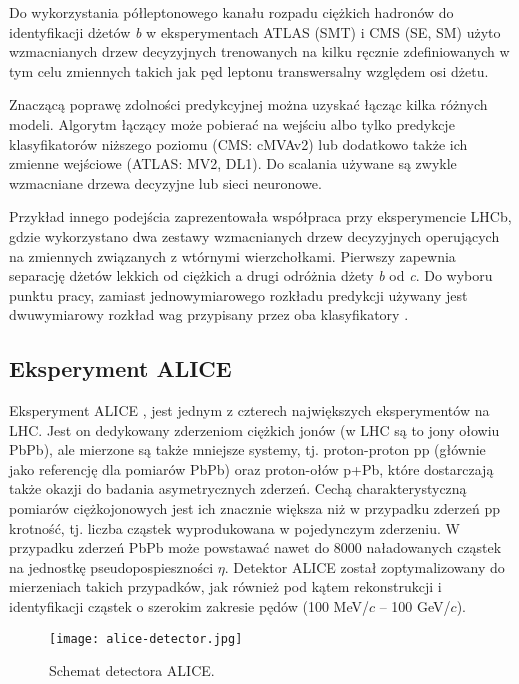 Do wykorzystania półleptonowego kanału rozpadu ciężkich hadronów do identyfikacji dżetów \textit{b} w eksperymentach ATLAS (SMT) i CMS (SE, SM) użyto wzmacnianych drzew decyzyjnych trenowanych na kilku ręcznie zdefiniowanych w tym celu zmiennych takich jak pęd leptonu transwersalny względem osi dżetu.

Znaczącą poprawę zdolności predykcyjnej można uzyskać łącząc kilka różnych modeli. 
Algorytm łączący może pobierać na wejściu albo tylko predykcje klasyfikatorów niższego poziomu (CMS: cMVAv2) lub dodatkowo także ich zmienne wejściowe (ATLAS: MV2, DL1). Do scalania używane są zwykle wzmacniane drzewa decyzyjne lub sieci neuronowe.

Przykład innego podejścia zaprezentowała współpraca przy eksperymencie LHCb, gdzie wykorzystano dwa zestawy wzmacnianych drzew decyzyjnych operujących na zmiennych związanych z wtórnymi wierzchołkami. Pierwszy zapewnia separację dżetów lekkich od ciężkich a drugi odróżnia dżety \textit{b} od \textit{c}. 
Do wyboru punktu pracy, zamiast jednowymiarowego rozkładu predykcji używany jest dwuwymiarowy rozkład wag przypisany przez oba klasyfikatory \cite{Aaij:2015yqa}.


\subsection{Eksperyment ALICE}

Eksperyment ALICE \cite{Aamodt:2008zz}, \cite{Abelev:2014ffa} jest jednym z czterech największych eksperymentów na LHC. Jest on dedykowany zderzeniom ciężkich jonów (w LHC są to jony ołowiu PbPb), ale mierzone są także mniejsze systemy, tj. proton-proton pp (głównie jako referencję dla pomiarów PbPb) oraz proton-ołów p+Pb, które dostarczają także okazji do badania asymetrycznych zderzeń. Cechą charakterystyczną pomiarów ciężkojonowych jest ich znacznie większa niż w przypadku zderzeń pp krotność, tj. liczba cząstek wyprodukowana w pojedynczym zderzeniu. W przypadku zderzeń PbPb może powstawać nawet do 8000 naładowanych cząstek na jednostkę pseudopospieszności $\eta$. Detektor ALICE został zoptymalizowany do mierzeniach takich przypadków, jak również pod kątem rekonstrukcji i identyfikacji cząstek o szerokim zakresie pędów (100 MeV/$c$ -- 100 GeV/$c$).


\begin{figure}[h]
	\centering
	\texttt{[image: alice-detector.jpg]}
	\caption{Schemat detectora ALICE.  }
	\label{fig:alice-detector}
\end{figure}


